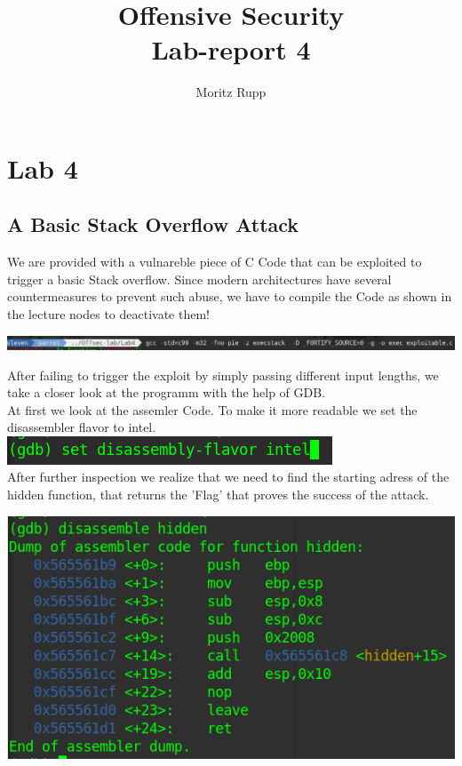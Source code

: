 \documentclass[a4paper,10pt]{article}
\title{Offensive Security\\Lab-report 4}
\author{Moritz Rupp}
\begin{document}
\maketitle


\newpage
\section{Lab 4}
\subsection{A Basic Stack Overflow Attack}
We are provided with a vulnareble piece of C Code that can be exploited to trigger a basic Stack overflow. Since modern architectures have several countermeasures to prevent such abuse, we have to compile the Code as shown in the lecture nodes to deactivate them!
\begin{center}
 \includegraphics[scale=0.3]{gcc.png}
\end{center} 
After failing to trigger the exploit by simply passing different input lengths, we take a closer look at the programm with the help of GDB.\\
At first we look at the assemler Code. To make it more readable we set the disassembler flavor to intel. \includegraphics[scale=0.4]{intelfalvor.png}\\
After further inspection we realize that we need to find the starting adress of the hidden function, that returns the 'Flag' that proves the success of the attack.
\begin{center}
 \includegraphics[scale=0.5]{hidden.png}
\end{center}
\end{document}
